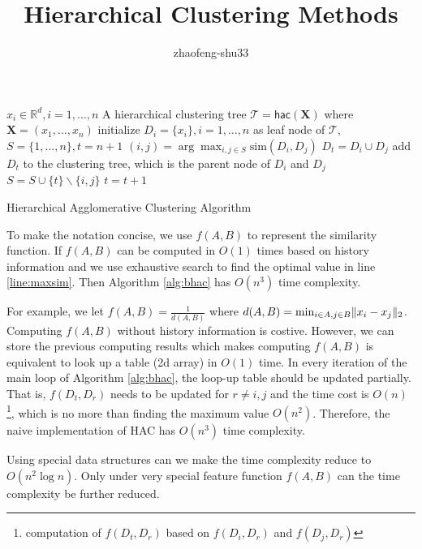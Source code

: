 \documentclass{article}
\title{Hierarchical Clustering Methods}
\author{zhaofeng-shu33}
\DeclarePairedDelimiter\abs{\lvert}{\rvert}
\DeclarePairedDelimiter\norm{\lVert}{\rVert}
\begin{document}
\maketitle
\begin{algorithm}\label{alg:bhac}
	\begin{algorithmic}[1]
		\REQUIRE $x_i \in \mathbb{R}^d, i=1,\dots, n$
		\ENSURE A hierarchical clustering tree $\mathcal{T} = \textsf{hac}(\mathbf{X})$ where $\mathbf{X}=(x_1,\dots, x_n)$
		\STATE initialize $D_i = \{x_i\}, i=1,\dots, n$ as leaf node of $\mathcal{T}$, $S=\{1, \dots, n\}, t=n+1$
		\STATE\label{line:maxsim} $(i,j) = \arg\max_{i,j \in S} \textrm{sim}(D_i, D_j)$
		\STATE $D_t = D_i \cup D_j$
		\STATE add $D_t$ to the clustering tree, which is the parent node of $D_i$ and $D_j$
		\STATE $S = S\cup \{t\}\backslash \{i, j\}$
		\STATE $t=t+1$
		\ENDWHILE
	\end{algorithmic}
\caption{Hierarchical Agglomerative Clustering Algorithm}
\end{algorithm}
To make the notation concise, we use $f(A,B)$ to represent the similarity function. If $f(A,B)$ can be computed in $O(1)$ times based on history information and we use exhaustive search to find the optimal value in line \ref{line:maxsim}. Then Algorithm \ref{alg:bhac} has $O(n^3)$ time complexity.

For example, we let $f(A,B) = \frac{1}{d(A,B)}$ where $d(A,B)=\min_{i\in A, j\in B} \norm{x_i - x_j}_2$. Computing $f(A,B)$ without history information is costive. However, we can store the previous computing results which makes computing $f(A,B)$ is equivalent to look up a table (2d array) in $O(1)$ time. In every iteration of the main loop of Algorithm \ref{alg:bhac}, the loop-up table should be updated partially. That is,  $f(D_t, D_r)$ needs to be updated for $r\neq i,j$ and the time cost is $O(n)$\footnote{computation of $f(D_t, D_r)$ based on $f(D_i, D_r)$ and $f(D_j, D_r)$}, which is no more than finding the maximum value $O(n^2)$. Therefore, the naive implementation of HAC has $O(n^3)$ time complexity. 

Using special data structures can we make the time complexity reduce to $O(n^2 \log n)$.
Only under very special feature function $f(A,B)$ can the time complexity be further reduced.
\end{document}
